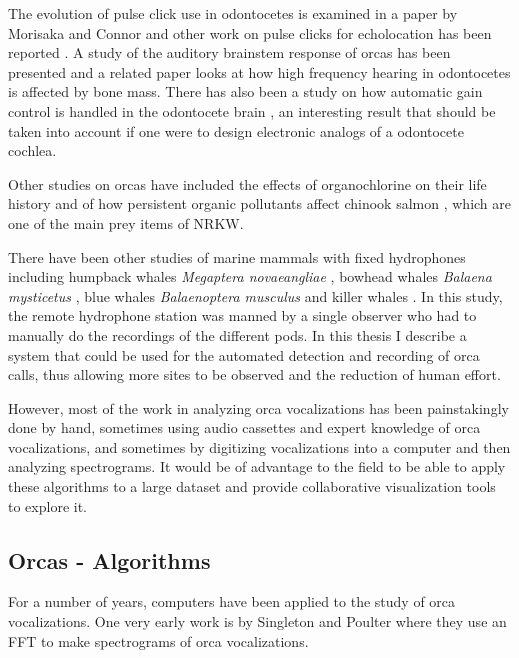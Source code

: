 \documentclass[12pt,oneside]{book}
\begin{document}
The evolution of pulse click use in odontocetes is examined in a paper
by Morisaka and Connor \cite{morisaka07predation} and other work on
pulse clicks for echolocation has been reported
\cite{simon07echolocation}.  A study of the auditory brainstem
response of orcas has been presented \cite{szymanski1999brainstem} and
a related paper \cite{hemil2001mass} looks at how high frequency
hearing in odontocetes is affected by bone mass.  There has also been
a study on how automatic gain control is handled in the odontocete
brain \cite{supin2008forward}, an interesting result that should be
taken into account if one were to design electronic analogs
\cite{lyon1982cochlea} of a odontocete cochlea.

Other studies on orcas have included the effects of organochlorine on
their life history \cite{ylitalo2001organochlorine} and of how
persistent organic pollutants affect chinook salmon
\cite{cullon2009pollutants}, which are one of the main prey items of
NRKW.

There have been other studies of marine mammals with fixed hydrophones
including humpback whales \textit{Megaptera novaeangliae}
\cite{norris1999humpback}, bowhead whales \textit{Balaena mysticetus}
\cite{cummings1985pam}, blue whales \textit{Balaenoptera musculus}
\cite{stafford1998longrange} and killer whales
\cite{morton2002displacement}.  In this study, the remote hydrophone
station was manned by a single observer who had to manually do the
recordings of the different pods.  In this thesis I describe a system
that could be used for the automated detection and recording of orca
calls, thus allowing more sites to be observed and the reduction of
human effort.

However, most of the work in analyzing orca vocalizations has been
painstakingly done by hand, sometimes using audio cassettes and expert
knowledge of orca vocalizations, and sometimes by digitizing
vocalizations into a computer and then analyzing spectrograms.  It
would be of advantage to the field to be able to apply these
algorithms to a large dataset and provide collaborative visualization
tools to explore it.

\subsection{Orcas - Algorithms}
\label{sec:relatedWork:orcasAlgorithms}

For a number of years, computers have been applied to the study of
orca vocalizations.  One very early work is by Singleton and Poulter
\cite{singleton1967spectral} where they use an FFT to make
spectrograms of orca vocalizations.
\end{document}
